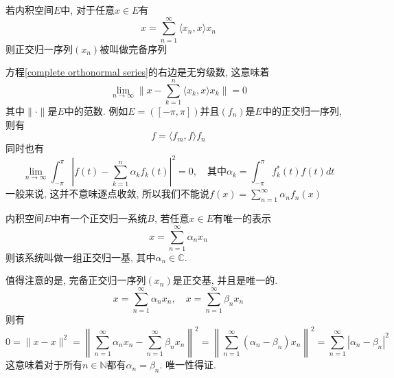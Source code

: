 \documentclass[a4paper,11pt]{article}
\theoremstyle{mystyle}
\begin{document}
\begin{definition}[完备正交归一序列]
  若内积空间$E$中, 对于任意$x\in E$有
  \begin{equation}\label{complete orthonormal series}
    x=\sum_{n=1}^{\infty}\langle x_n,x\rangle x_n
  \end{equation}
  则正交归一序列$(x_n)$被叫做完备序列
\end{definition}
方程\eqref{complete orthonormal series}的右边是无穷级数, 这意味着
\begin{equation*}
  \lim_{n\to\infty}\|x-\sum_{k=1}^{n}\langle x_k,x\rangle x_k\|=0
\end{equation*}
其中$\|\cdot\|$是$E$中的范数. 例如$E=([-\pi,\pi])$并且$(f_n)$是$E$中的正交归一序列, 则有
\begin{equation*}
  f=\langle f_m,f\rangle f_n
\end{equation*}
同时也有
\begin{equation*}
  \lim_{n\to\infty}\int_{-\pi}^{\pi}\left|f(t)-\sum_{k=1}^{n}\alpha_k f_k(t)\right|^2=0,\quad \text{其中}\alpha_k=\int_{-\pi}^{\pi}f_k^*(t)f(t)dt
\end{equation*}
一般来说, 这并不意味逐点收敛, 所以我们不能说$f(x)=\sum_{n=1}^{\infty}\alpha_n f_n(x)$
\begin{definition}[正交归一基]
  内积空间$E$中有一个正交归一系统$B$, 若任意$x\in E$有唯一的表示
  \begin{equation*}
    x=\sum_{n=1}^{\infty}\alpha_n x_n
  \end{equation*}
  则该系统叫做一组正交归一基, 其中$\alpha_n\in \mathbb{C}$.
\end{definition}
值得注意的是, 完备正交归一序列$(x_n)$是正交基, 并且是唯一的.
\begin{equation*}
  x=\sum_{n=1}^{\infty}\alpha_n x_n,\quad x=\sum_{n=1}^{\infty}\beta_n x_n
\end{equation*}
则有
\begin{equation*}
  0=\|x-x\|^2=\left\|\sum_{n=1}^{\infty}\alpha_n x_n-\sum_{n=1}^{\infty}\beta_n x_n\right\|^2=\left\|\sum_{n=1}^{\infty}(\alpha_n-\beta_n)x_n\right\|^2=\sum_{n=1}^{\infty}|\alpha_n-\beta_n|^2
\end{equation*}
这意味着对于所有$n\in\mathbb{N}$都有$\alpha_n=\beta_n$. 唯一性得证.
\end{document}
